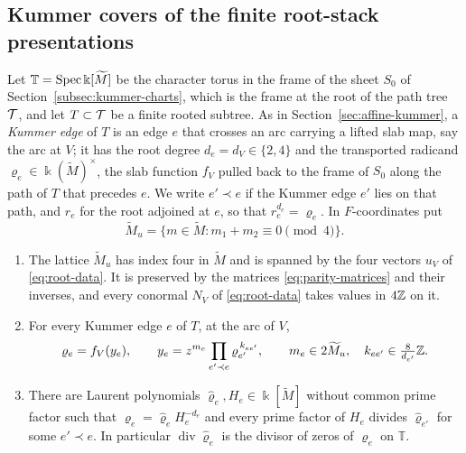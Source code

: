 \subsection{Kummer covers of the finite root-stack presentations}
\label{subsec:root-stage-regularity}

Let $\mathbb T=\operatorname{Spec}\Bbbk[\widetilde M]$ be the character torus in the frame of the
sheet $S_0$ of Section~\ref{subsec:kummer-charts}, which is the frame at the
root of the path tree $\mathcal T$, and let $T\subset\mathcal T$ be a finite rooted
subtree.  As in Section~\ref{sec:affine-kummer}, a \emph{Kummer edge} of $T$ is
an edge $e$ that crosses an arc carrying a lifted slab map, say the arc
at $V$; it has the root degree $d_e=d_V\in\{2,4\}$ and the transported
radicand $\varrho_e\in\Bbbk(\widetilde M)^\times$, the slab function $f_V$
pulled back to the frame of $S_0$ along the path of $T$ that precedes
$e$.  We write $e'\prec e$ if the Kummer edge $e'$ lies on that path, and
$r_e$ for the root adjoined at $e$, so that $r_e^{d_e}=\varrho_e$.  In
$F$-coordinates put
\[
 \widetilde M_u=\{m\in\widetilde M:m_1+m_2\equiv0\pmod 4\}.
\]

\begin{lemma}\label{lem:transported-radicands}
\begin{enumerate}
\item The lattice $\widetilde M_u$ has index four in $\widetilde M$ and is
spanned by the four vectors $u_V$ of \eqref{eq:root-data}.  It is preserved
by the matrices \eqref{eq:parity-matrices} and their inverses, and every
conormal $N_V$ of \eqref{eq:root-data} takes values in $4\mathbb Z$ on it.
\item For every Kummer edge $e$ of $T$, at the arc of $V$,
\[
 \varrho_e=f_V(y_e),\qquad
 y_e=z^{m_e}\prod_{e'\prec e}\varrho_{e'}^{\,k_{ee'}},
 \qquad
 m_e\in2\widetilde M_u,\quad k_{ee'}\in\tfrac8{d_{e'}}\mathbb Z .
\]
\item There are Laurent polynomials $\widehat\varrho_e,H_e\in\Bbbk[\widetilde M]$
without common prime factor such that
$\varrho_e=\widehat\varrho_eH_e^{-d_e}$ and every prime factor of
$H_e$ divides $\widehat\varrho_{e'}$ for some $e'\prec e$.  In particular
$\operatorname{div}\widehat\varrho_e$ is the divisor of zeros of $\varrho_e$ on $\mathbb T$.
\end{enumerate}
\end{lemma}

